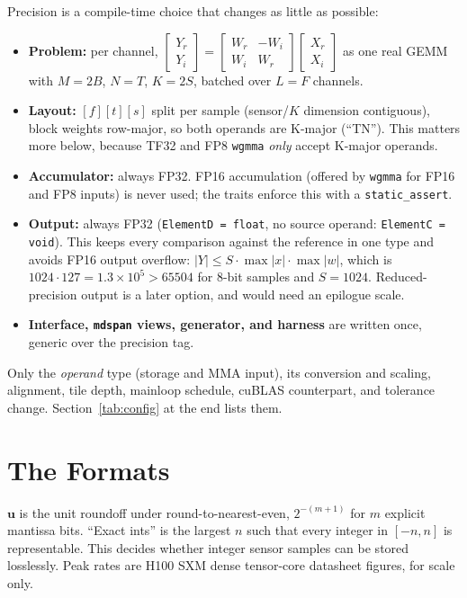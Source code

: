 \documentclass[10pt,letterpaper]{article}
\newcommand{\ur}{\mathbf{u}}
\begin{document}
Precision is a compile-time choice that changes as little as possible:
\begin{itemize}
  \item \textbf{Problem:} per channel, $\left[\begin{smallmatrix} Y_r \\ Y_i \end{smallmatrix}\right] = \left[\begin{smallmatrix} W_r & -W_i \\ W_i & W_r \end{smallmatrix}\right] \left[\begin{smallmatrix} X_r \\ X_i \end{smallmatrix}\right]$ as one real GEMM with $M = 2B$, $N = T$, $K = 2S$, batched over $L = F$ channels.
  \item \textbf{Layout:} $[f][t][s]$ split per sample (sensor/$K$ dimension contiguous), block weights row-major, so both operands are K-major (``TN''). This matters more below, because TF32 and FP8 \texttt{wgmma} \emph{only} accept K-major operands.
  \item \textbf{Accumulator:} always FP32. FP16 accumulation (offered by \texttt{wgmma} for FP16 and FP8 inputs) is never used; the traits enforce this with a \texttt{static\_assert}.
  \item \textbf{Output:} always FP32 (\texttt{ElementD = float}, no source operand: \texttt{ElementC = void}). This keeps every comparison against the reference in one type and avoids FP16 output overflow: $|Y| \le S \cdot \max|x| \cdot \max|w|$, which is $1024 \cdot 127 = 1.3 \times 10^5 > 65504$ for 8-bit samples and $S = 1024$. Reduced-precision output is a later option, and would need an epilogue scale.
  \item \textbf{Interface, \texttt{mdspan} views, generator, and harness} are written once, generic over the precision tag.
\end{itemize}
Only the \emph{operand} type (storage and MMA input), its conversion and scaling, alignment, tile depth, mainloop schedule, cuBLAS counterpart, and tolerance change. Section~\ref{tab:config} at the end lists them.

\section{The Formats}

$\ur$ is the unit roundoff under round-to-nearest-even, $2^{-(m+1)}$ for $m$ explicit mantissa bits. ``Exact ints'' is the largest $n$ such that every integer in $[-n, n]$ is representable. This decides whether integer sensor samples can be stored losslessly. Peak rates are H100 SXM dense tensor-core datasheet figures, for scale only.
\end{document}
